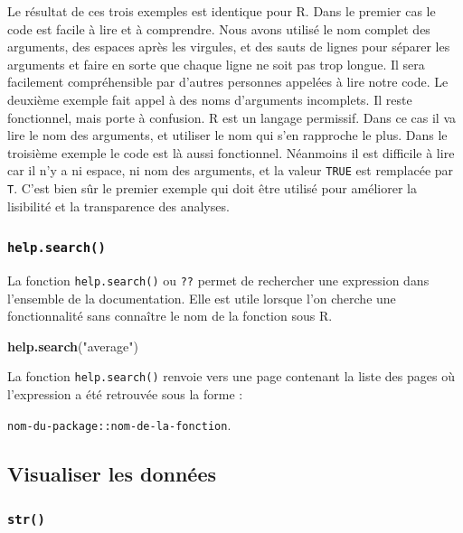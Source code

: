 \documentclass[twoside,symmetric]{book}
\newenvironment{Shaded}{}{}
\newcommand{\KeywordTok}[1]{\textbf{#1}}
\newcommand{\NormalTok}[1]{#1}
\newcommand{\StringTok}[1]{#1}
\begin{document}
Le résultat de ces trois exemples est identique pour R. Dans le premier cas le code est facile à lire et à comprendre. Nous avons utilisé le nom complet des arguments, des espaces après les virgules, et des sauts de lignes pour séparer les arguments et faire en sorte que chaque ligne ne soit pas trop longue. Il sera facilement compréhensible par d'autres personnes appelées à lire notre code. Le deuxième exemple fait appel à des noms d'arguments incomplets. Il reste fonctionnel, mais porte à confusion. R est un langage permissif. Dans ce cas il va lire le nom des arguments, et utiliser le nom qui s'en rapproche le plus. Dans le troisième exemple le code est là aussi fonctionnel. Néanmoins il est difficile à lire car il n'y a ni espace, ni nom des arguments, et la valeur \texttt{TRUE} est remplacée par \texttt{T}. C'est bien sûr le premier exemple qui doit être utilisé pour améliorer la lisibilité et la transparence des analyses.

\hypertarget{l015helpsearch}{%
\subsubsection{\texorpdfstring{\texttt{help.search()}}{help.search()}}\label{l015helpsearch}}

La fonction \texttt{help.search()} ou \texttt{??} permet de rechercher une expression dans l'ensemble de la documentation. Elle est utile lorsque l'on cherche une fonctionnalité sans connaître le nom de la fonction sous R.

\begin{Shaded}
\begin{Highlighting}[]
\KeywordTok{help.search}\NormalTok{(}\StringTok{"average"}\NormalTok{)}
\end{Highlighting}
\end{Shaded}

La fonction \texttt{help.search()} renvoie vers une page contenant la liste des pages où l'expression a été retrouvée sous la forme :

\texttt{nom-du-package::nom-de-la-fonction}.

\hypertarget{visualiser-les-donnuxe9es}{%
\subsection{Visualiser les données}\label{visualiser-les-donnuxe9es}}

\hypertarget{l015str}{%
\subsubsection{\texorpdfstring{\texttt{str()}}{str()}}\label{l015str}}
\end{document}
